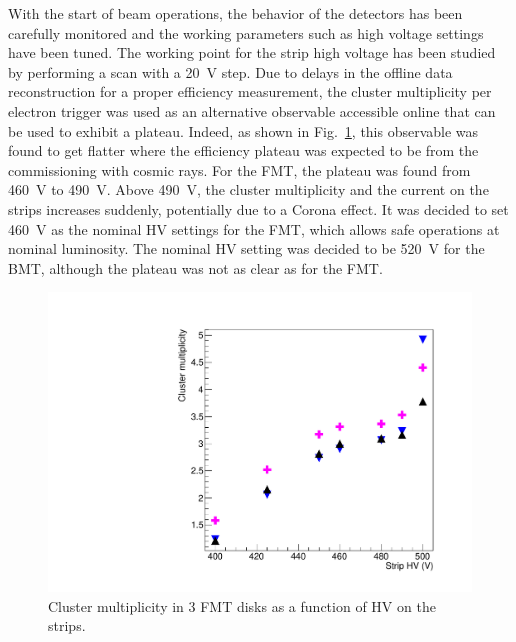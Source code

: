 With the start of beam operations, the behavior of the detectors has been carefully monitored and the working parameters
such as high voltage settings have been tuned. The working point for the strip high voltage has been studied by performing a
scan with a 20~V step. Due to delays in the offline data reconstruction for a proper efficiency measurement, the cluster
multiplicity per electron trigger was used as an alternative observable accessible online that can be used to exhibit a plateau. 
Indeed, as shown in Fig.~\ref{fig:mm-fig15}, this observable was found to get flatter where the efficiency plateau was expected
to be from the commissioning with cosmic rays. For the FMT, the plateau was found from 460~V to 490~V. Above 490~V, the
cluster multiplicity and the current on the strips increases suddenly, potentially due to a Corona effect. It was decided to set
460~V as the nominal HV settings for the FMT, which allows safe operations at nominal luminosity. The nominal HV setting was
decided to be 520~V for the BMT, although the plateau was not as clear as for the FMT.  

\begin{figure}[htb]
 \includegraphics[width=1.0\columnwidth,keepaspectratio]{images/PseudoEfficiencies_ClusterMultiplicities_FMT_only3layers.pdf}
 \caption{Cluster multiplicity in 3 FMT disks as a function of HV on the strips.}
 \label{fig:mm-fig15}
\end{figure}

